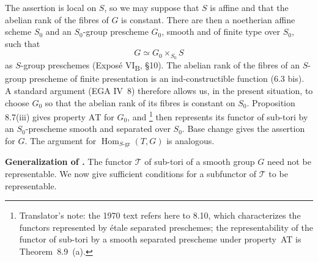 The assertion is local on \(S\), so we may suppose that \(S\) is
affine and that the abelian rank of the fibres of \(G\) is constant.
There are then a noetherian affine scheme \(S_0\) and an
\(S_0\)-group prescheme \(G_0\), smooth and of finite type over
\(S_0\), such that
\[
  G\simeq G_0\times_{S_0}S
\]
as \(S\)-group preschemes (Exposé VI\textsubscript{B}, \S10).
The abelian rank of the fibres of an \(S\)-group prescheme of finite
presentation is an ind-constructible function (6.3 bis). A standard
argument (EGA IV~8) therefore allows us, in the present situation,
to choose \(G_0\) so that the abelian rank of its fibres is constant
on \(S_0\). Proposition 8.7(iii) gives property \(\mathrm{AT}\) for
\(G_0\), and \footnote{Translator's note: the 1970 text refers
here to 8.10, which characterizes the functors represented by étale separated
preschemes; the representability of the functor of sub-tori by a smooth
separated prescheme under property~AT is Theorem~8.9~(a).} then represents its functor of sub-tori by
an \(S_0\)-prescheme smooth and separated over \(S_0\). Base change
gives the assertion for \(G\). The argument for
\(\operatorname{Hom}_{S\text{-gr}}(T,G)\) is analogous.

\medskip\noindent\textbf{Generalization of .}
The functor \(\mathcal T\) of sub-tori of a smooth group \(G\) need
not be representable. We now give sufficient conditions for a
subfunctor of \(\mathcal T\) to be representable.


